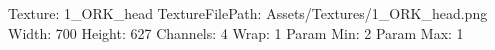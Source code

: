 Texture: 1_ORK_head
TextureFilePath: Assets/Textures/1_ORK_head.png
Width: 700
Height: 627
Channels: 4
Wrap: 1
Param Min: 2
Param Max: 1